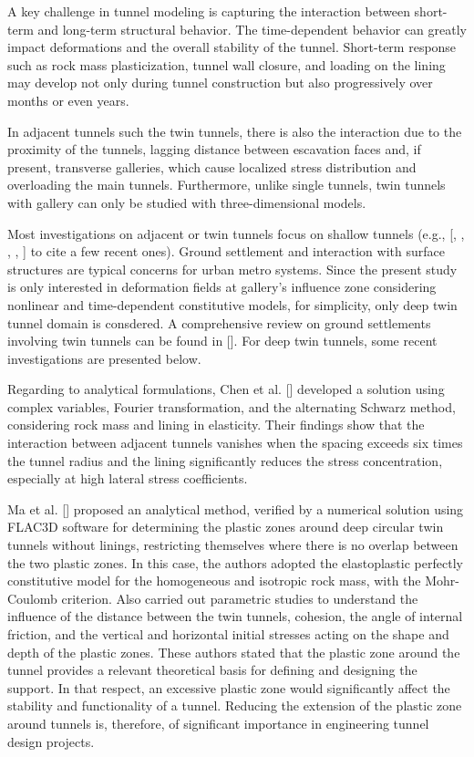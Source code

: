 \documentclass[a4paper,fleqn]{cas-sc}
\begin{document}
A key challenge in tunnel modeling is capturing the interaction between short-term and long-term structural behavior. The time-dependent behavior can greatly impact deformations and the overall stability of the tunnel. Short-term response such as rock mass plasticization, tunnel wall closure, and loading on the lining may develop not only during tunnel construction but also progressively over months or even years.

In adjacent tunnels such the twin tunnels, there is also the interaction due to the proximity of the tunnels, lagging distance between escavation faces and, if present, transverse galleries, which cause localized stress distribution and overloading the main tunnels. Furthermore, unlike single tunnels, twin tunnels with gallery can only be studied with three-dimensional models.

Most investigations on adjacent or twin tunnels focus on shallow tunnels (e.g., [, , , , ] to cite a few recent ones). Ground settlement and interaction with surface structures are typical concerns for urban metro systems. Since the present study is only interested in deformation fields at gallery's influence zone considering nonlinear and time-dependent constitutive models, for simplicity, only deep twin tunnel domain is consdered. A comprehensive review on ground settlements involving twin tunnels can be found in []. For deep twin tunnels, some recent investigations are presented below.

Regarding to analytical formulations, Chen et al. [] developed a solution using complex variables, Fourier transformation, and the alternating Schwarz method, considering rock mass and lining in elasticity. Their findings show that the interaction between adjacent tunnels vanishes when the spacing exceeds six times the tunnel radius and the lining significantly reduces the stress concentration, especially at high lateral stress coefficients.

Ma et al. [] proposed an analytical method, verified by a numerical solution using FLAC3D software for determining the plastic zones around deep circular twin tunnels without linings, restricting themselves where there is no overlap between the two plastic zones. In this case, the authors adopted the elastoplastic perfectly constitutive model for the homogeneous and isotropic rock mass, with the Mohr-Coulomb criterion. Also carried out parametric studies to understand the influence of the distance between the twin tunnels, cohesion, the angle of internal friction, and the vertical and horizontal initial stresses acting on the shape and depth of the plastic zones. These authors stated that the plastic zone around the tunnel provides a relevant theoretical basis for defining and designing the support. In that respect, an excessive plastic zone would significantly affect the stability and functionality of a tunnel. Reducing the extension of the plastic zone around tunnels is, therefore, of significant importance in engineering tunnel design projects.
\end{document}
